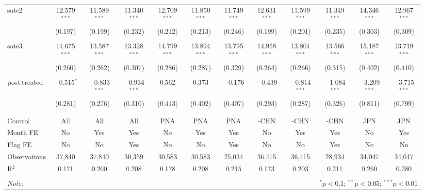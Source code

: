 \documentclass[11pt,english]{article}
\begin{document}
\begin{landscape}
\begin{table}[!htbp]
\begin{tabular}{@{\extracolsep{1pt}}lccccccccccc}
 sate2 & 12.579$^{***}$ & 11.589$^{***}$ & 11.340$^{***}$ & 12.709$^{***}$ & 11.850$^{***}$ & 11.749$^{***}$ & 12.631$^{***}$ & 11.599$^{***}$ & 11.349$^{***}$ & 14.346$^{***}$ & 12.967$^{***}$ \\ 
  & (0.197) & (0.199) & (0.232) & (0.212) & (0.213) & (0.246) & (0.199) & (0.201) & (0.235) & (0.303) & (0.309) \\ 
  & & & & & & & & & & & \\ 
 sate3 & 14.675$^{***}$ & 13.587$^{***}$ & 13.328$^{***}$ & 14.799$^{***}$ & 13.894$^{***}$ & 13.795$^{***}$ & 14.958$^{***}$ & 13.804$^{***}$ & 13.566$^{***}$ & 15.187$^{***}$ & 13.719$^{***}$ \\ 
  & (0.260) & (0.262) & (0.307) & (0.286) & (0.287) & (0.329) & (0.264) & (0.266) & (0.315) & (0.402) & (0.410) \\ 
  & & & & & & & & & & & \\ 
 post:treated & $-$0.515$^{*}$ & $-$0.833$^{***}$ & $-$0.934$^{***}$ & 0.562 & 0.373 & $-$0.176 & $-$0.439 & $-$0.814$^{***}$ & $-$1.084$^{***}$ & $-$3.209$^{***}$ & $-$3.715$^{***}$ \\ 
  & (0.281) & (0.276) & (0.310) & (0.413) & (0.402) & (0.407) & (0.293) & (0.287) & (0.326) & (0.811) & (0.799) \\ 
  & & & & & & & & & & & \\ 
\hline \\[-1.8ex] 
Control & All & All & All & PNA & PNA & PNA & -CHN & -CHN & -CHN & JPN & JPN \\ 
Month FE & No & Yes & Yes & No & Yes & Yes & No & Yes & Yes & No & Yes \\ 
Flag FE & No & No & Yes & No & No & Yes & No & No & Yes & No & No \\ 
Observations & 37,840 & 37,840 & 30,359 & 30,583 & 30,583 & 25,034 & 36,415 & 36,415 & 28,934 & 34,047 & 34,047 \\ 
R$^{2}$ & 0.171 & 0.200 & 0.208 & 0.178 & 0.208 & 0.215 & 0.173 & 0.203 & 0.211 & 0.260 & 0.280 \\ 
\hline 
\hline \\[-1.8ex] 
\textit{Note:}  & \multicolumn{11}{r}{$^{*}$p$<$0.1; $^{**}$p$<$0.05; $^{***}$p$<$0.01} \\ 
\end{tabular} 
\end{table} 

\end{landscape}
\clearpage
\end{document}
